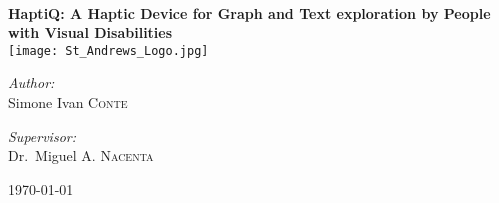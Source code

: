 
\begin{titlepage}
\begin{center}


\HRule \\[0.4cm]
{ \huge \bfseries HaptiQ: A Haptic Device for Graph and Text exploration by People with Visual Disabilities }
\HRule \\[0.4cm]

\texttt{[image: St\_Andrews\_Logo.jpg]} %

\begin{minipage}{0.4\textwidth}
\begin{flushleft} \large
\emph{Author:}\\
Simone Ivan \textsc{Conte}
\end{flushleft}
\end{minipage}
\begin{minipage}{0.4\textwidth}
\begin{flushright} \large
\emph{Supervisor:} \\
Dr.~Miguel A. \textsc{Nacenta}
\end{flushright}
\end{minipage}

\vfill

{\large \today}

\end{center}
\end{titlepage}